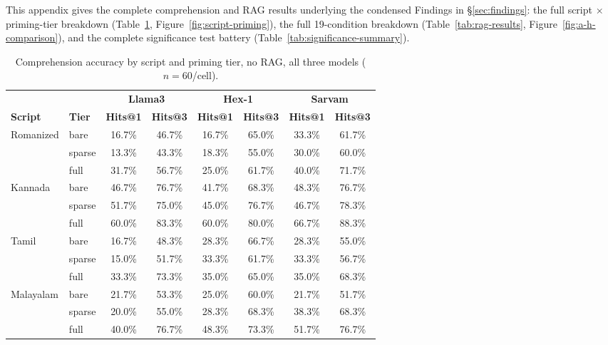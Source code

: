 \documentclass[11pt]{article}
\begin{document}
This appendix gives the complete comprehension and RAG results underlying the condensed Findings in \S\ref{sec:findings}: the full script $\times$ priming-tier breakdown (Table~\ref{tab:comprehension}, Figure~\ref{fig:script-priming}), the full 19-condition breakdown (Table~\ref{tab:rag-results}, Figure~\ref{fig:a-h-comparison}), and the complete significance test battery (Table~\ref{tab:significance-summary}).

\begin{table}[t]
\centering
\small
\begin{tabular}{@{}llcccccc@{}}
\toprule
& & \multicolumn{2}{c}{\textbf{Llama3}} & \multicolumn{2}{c}{\textbf{Hex-1}} & \multicolumn{2}{c}{\textbf{Sarvam}} \\
\cmidrule(lr){3-4}\cmidrule(lr){5-6}\cmidrule(lr){7-8}
\textbf{Script} & \textbf{Tier} & \textbf{Hits@1} & \textbf{Hits@3} & \textbf{Hits@1} & \textbf{Hits@3} & \textbf{Hits@1} & \textbf{Hits@3} \\
\midrule
\multirow{3}{*}{Romanized} & bare   & 16.7\% & 46.7\% & 16.7\% & 65.0\% & 33.3\% & 61.7\% \\
                            & sparse & 13.3\% & 43.3\% & 18.3\% & 55.0\% & 30.0\% & 60.0\% \\
                            & full   & 31.7\% & 56.7\% & 25.0\% & 61.7\% & 40.0\% & 71.7\% \\
\midrule
\multirow{3}{*}{Kannada} & bare   & 46.7\% & 76.7\% & 41.7\% & 68.3\% & 48.3\% & 76.7\% \\
                          & sparse & 51.7\% & 75.0\% & 45.0\% & 76.7\% & 46.7\% & 78.3\% \\
                          & full   & 60.0\% & 83.3\% & 60.0\% & 80.0\% & 66.7\% & 88.3\% \\
\midrule
\multirow{3}{*}{Tamil} & bare   & 16.7\% & 48.3\% & 28.3\% & 66.7\% & 28.3\% & 55.0\% \\
                        & sparse & 15.0\% & 51.7\% & 33.3\% & 61.7\% & 33.3\% & 56.7\% \\
                        & full   & 33.3\% & 73.3\% & 35.0\% & 65.0\% & 35.0\% & 68.3\% \\
\midrule
\multirow{3}{*}{Malayalam} & bare   & 21.7\% & 53.3\% & 25.0\% & 60.0\% & 21.7\% & 51.7\% \\
                            & sparse & 20.0\% & 55.0\% & 28.3\% & 68.3\% & 38.3\% & 68.3\% \\
                            & full   & 40.0\% & 76.7\% & 48.3\% & 73.3\% & 51.7\% & 76.7\% \\
\bottomrule
\end{tabular}
\caption{Comprehension accuracy by script and priming tier, no RAG, all three models ($n=60$/cell).}
\label{tab:comprehension}
\end{table}
\end{document}
